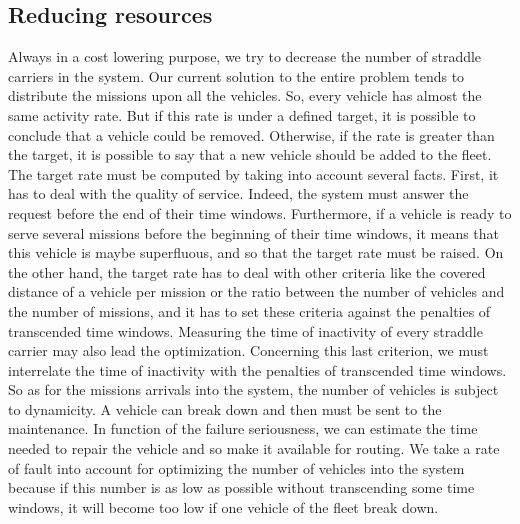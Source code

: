\documentclass[a4paper,10pt]{article}
\begin{document}
\begin{multicols}{2}
\subsection{Reducing resources}
Always in a cost lowering purpose, we try to decrease the number of straddle carriers in the system. Our current solution to the entire problem tends to distribute the missions upon all the vehicles. So, every vehicle has almost the same activity rate. But if this rate is under a defined target, it is possible to conclude that a vehicle could be removed. Otherwise, if the rate is greater than the target, it is possible to say that a new vehicle should be added to the fleet.\\

The target rate must be computed by taking into account several facts. First, it has to deal with the quality of service. Indeed, the system must answer the request before the end of their time windows. Furthermore, if a vehicle is ready to serve several missions before the beginning of their time windows, it means that this vehicle is maybe superfluous, and so that the target rate must be raised. On the other hand, the target rate has to deal with other criteria like the covered distance of a vehicle per mission or the ratio between the number of vehicles and the number of missions, and it has to set these criteria against the penalties of transcended time windows. Measuring the time of inactivity of every straddle carrier may also lead the optimization. Concerning this last criterion, we must interrelate the time of inactivity with the penalties of transcended time windows.\\

So as for the missions arrivals into the system, the number of vehicles is subject to dynamicity. A vehicle can break down and then must be sent to the maintenance. In function of the failure seriousness, we can estimate the time needed to repair the vehicle and so make it available for routing. We take a rate of fault into account for optimizing the number of vehicles into the system because if this number is as low as possible without transcending some time windows, it will become too low if one vehicle of the fleet break down.


\end{multicols}
\end{document}
